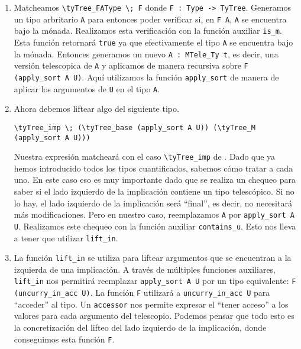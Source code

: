 \begin{enumerate}
    \item Matcheamos \lstinline{\tyTree_FAType \; F} donde \lstinline{F : Type -> TyTree}. Generamos un tipo arbritario \lstinline{A} para entonces poder verificar si, en \lstinline{F A}, \lstinline{A} se encuentra bajo la mónada. Realizamos esta verificación con la función auxiliar \lstinline{is_m}. Esta función retornará \lstinline{true} ya que efectivamente el tipo \lstinline{A} se encuentra bajo la mónada. Entonces generamos un nuevo \lstinline{A : MTele_Ty t}, es decir, una versión telescopica de \lstinline{A} y aplicamos \lift de manera recursiva sobre \lstinline{F (apply_sort A U)}. Aquí utilizamos la función \lstinline{apply_sort} de manera de aplicar los argumentos de \lstinline{U} en el tipo \lstinline{A}.
    \item Ahora debemos liftear algo del siguiente tipo.
    \begin{lstlisting}[frame=tb]
\tyTree_imp \; (\tyTree_base (apply_sort A U)) (\tyTree_M (apply_sort A U)))
    \end{lstlisting}
    Nuestra expresión matcheará con el caso \lstinline{\tyTree_imp} de \lift. Dado que ya hemos introducido todos los tipos cuantificados, sabemos cómo tratar a cada uno. En este caso eso es muy importante dado que se realiza un chequeo para saber si el lado izquierdo de la implicación contiene un tipo telescópico. Si no lo hay, el lado izquierdo de la implicación será ``final'', es decir, no necesitará más modificaciones. Pero en nuestro caso, reemplazamos \lstinline{A} por \lstinline{apply_sort A U}. Realizamos este chequeo con la función auxiliar \lstinline{contains_u}. Esto nos lleva a tener que utilizar \lstinline{lift_in}.
    \item La función \lstinline{lift_in} se utiliza para liftear argumentos que se encuentran a la izquierda de una implicación.
    A través de múltiples funciones auxiliares, \lstinline{lift_in} nos permitirá reemplazar \lstinline{apply_sort A U} por un tipo equivalente: \lstinline{F (uncurry_in_acc U)}. La función \lstinline{F} utilizará a \lstinline{uncurry_in_acc U} para ``acceder'' al tipo. Un \lstinline{accessor} nos permite expresar el ``tener acceso'' a los valores para cada argumento del telescopio.
    Podemos pensar que todo esto es la concretización del lifteo del lado izquierdo de la implicación, donde conseguimos esta función \lstinline{F}.

\end{enumerate}
